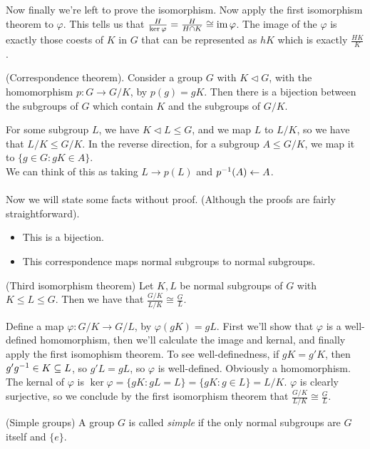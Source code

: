 \documentclass{article}
\newcommand{\nrm}{\triangleleft}
\begin{document}
\begin{itemize}
Now finally we're left to prove the isomorphism. Now apply the first isomorphism theorem to $ \varphi $. This tells us that $ \frac H{\ker \varphi}=\frac H {H\cap K}\cong \operatorname{im} \varphi $. The image of the $ \varphi $ is exactly those coests of $ K $ in $ G $ that can be represented as $ hK $ which is exactly $ \frac{HK}K $.\\
\begin{theorem}
	(Correspondence theorem). Consider a group $ G $ with $ K\nrm G $, with the homomorphism $ p:G\to G/K $, by $ p(g)=gK $. Then there is a bijection between the subgroups of $ G $ which contain $ K $ and the subgroups of $ G/K $.
\end{theorem}
\pf For some subgroup $ L $, we have $ K\nrm L \le G $, and we map $ L $ to $ L/K $, so we have that $ L/K\le G/K $. In the reverse direction, for a subgroup $ A\le G/K $, we map it to $ \{g\in G: gK\in A\} $.\\
We can think of this as taking $ L\to p(L) $ and $ {p}^{-1}(A)\leftarrow A $.
\\\\ Now we will state some facts without proof. (Although the proofs are fairly straightforward).
\begin{itemize}
	\item This is a bijection.
	\item This correspondence maps normal subgroups to normal subgroups.
\end{itemize}
\begin{theorem}
	(Third isomorphism theorem) Let $ K,L $ be normal subgroups of $ G $ with $ K\le L\le G $. Then we have that $ \frac{G/K}{L/K}\cong \frac GL $.
\end{theorem}
\pf Define a map $ \varphi: G/K \rightarrow G/L $, by $ \varphi(gK)=gL $. First we'll show that $ \varphi $ is a well-defined homomorphism, then we'll calculate the image and kernal, and finally apply the first isomophism theorem. To see well-definedness, if $ gK=g'K $, then $ g'{g}^{-1}\in K\subseteq L $, so $ g'L=gL $, so $ \varphi $ is well-defined. Obviously a homomorphism.\\
The kernal of $ \varphi $ is $ \ker \varphi = \{gK:gL=L\} =\{gK: g\in L\} = L/K $. $ \varphi $ is clearly surjective, so we conclude by the first isomorphism theorem that $ \frac{G/K}{L/K}\cong \frac GL $.
\begin{definition}
	(Simple groups) A group $ G $ is called \textit{simple} if the only normal subgroups are $ G $ itself and $ \{ e \} $.
\end{definition}

\end{itemize}
\end{document}
